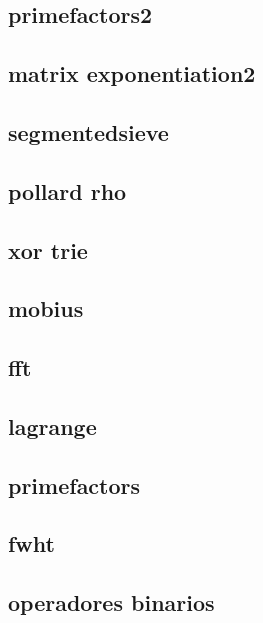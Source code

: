\subsection{primefactors2}
\raggedbottom
\hrulefill
\subsection{matrix exponentiation2}
\raggedbottom
\hrulefill
\subsection{segmentedsieve}
\raggedbottom
\hrulefill
\subsection{pollard rho}
\raggedbottom
\hrulefill
\subsection{xor trie}
\raggedbottom
\hrulefill
\subsection{mobius}
\raggedbottom
\hrulefill
\subsection{fft}
\raggedbottom
\hrulefill
\subsection{lagrange}
\raggedbottom
\hrulefill
\subsection{primefactors}
\raggedbottom
\hrulefill
\subsection{fwht}
\raggedbottom
\hrulefill
\subsection{operadores binarios}
\raggedbottom
\hrulefill
